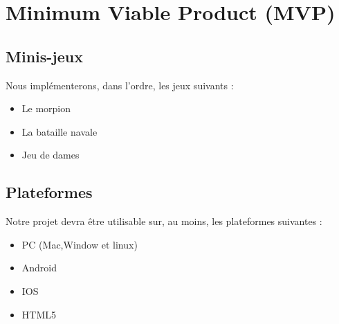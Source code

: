 \documentclass{report}
\begin{document}
\section{Minimum Viable Product (MVP)}
\subsection{Minis-jeux}
Nous implémenterons, dans l’ordre, les jeux suivants :
\begin{itemize}
	\item Le morpion
    \item La bataille navale
    \item Jeu de dames
\end{itemize}
\subsection{Plateformes}
Notre projet devra être utilisable sur, au moins, les plateformes suivantes :
\begin{itemize}
	\item PC (Mac,Window et linux)
    \item Android
    \item IOS
    \item HTML5
\end{itemize}
\end{document}

